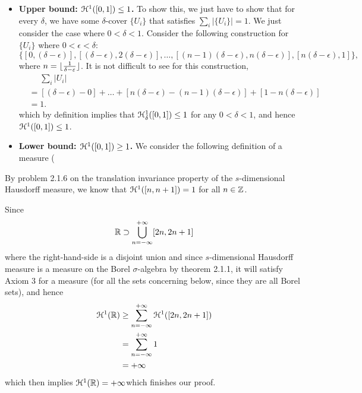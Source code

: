 \begin{itemize}
    \begin{itemize}
        \item \textbf{Upper bound: \(\mathcal{H}^1([0, 1]) \leq 1\).} To show this, we just have to show that for every \(\delta\), we have some \(\delta\)-cover \(\{U_i\}\) that satisfies \(\sum_{i}|\{U_i\}|=1\). We just consider the case where \(0 < \delta < 1\). Consider the following construction for \(\{U_i\}\) where \(0 < \epsilon < \delta\):
        \[
        \{[0, (\delta - \epsilon)], [(\delta - \epsilon), 2(\delta - \epsilon)], \ldots, [(n-1) (\delta - \epsilon), n(\delta - \epsilon)], [n(\delta - \epsilon), 1]\},
        \]
        where \(n = \lfloor\frac{1}{\delta - \varepsilon}\rfloor\). It is not difficult to see for this construction,
        \begin{align*}
            &\phantom{=}\sum_{i} |U_i|\\
            &= [(\delta - \epsilon) - 0] + \ldots + [n(\delta - \epsilon) - (n-1) (\delta - \epsilon)] + [1 - n(\delta - \epsilon)]\\
            &= 1.
        \end{align*}
        which by definition implies that \(\mathcal{H}_\delta^1([0, 1]) \leq 1\) for any \(0 < \delta < 1\), and hence \(\mathcal{H}^1([0, 1]) \leq 1\).
        \item \textbf{Lower bound: \(\mathcal{H}^1([0, 1]) \geq 1\).} We consider the following definition of a measure (
    \end{itemize}
    
    By problem 2.1.6 on the translation invariance property of the \(s\)-dimensional Hausdorff measure, we know that \(\mathcal{H}^1([n, n + 1]) = 1\) for all \(n \in \mathbb{Z}\).
    
    Since
    \[\mathbb{R} \supset \bigcup_{n = -\infty}^{+\infty} [2n, 2n + 1]\]
    where the right-hand-side is a disjoint union and since \(s\)-dimensional Hausdorff measure is a measure on the Borel \(\sigma\)-algebra by theorem 2.1.1, it will satisfy Axiom 3 for a measure (for all the sets concerning below, since they are all Borel sets), and hence
    \begin{align*}
        \mathcal{H}^1(\mathbb{R}) &\geq \sum_{n = -\infty}^{+\infty} \mathcal{H}^1([2n, 2n + 1])\\
        &= \sum_{n = -\infty}^{+\infty} 1\\
        &= +\infty
    \end{align*}
    which then implies \(\mathcal{H}^1(\mathbb{R}) = +\infty\)which finishes our proof.
\end{itemize}


